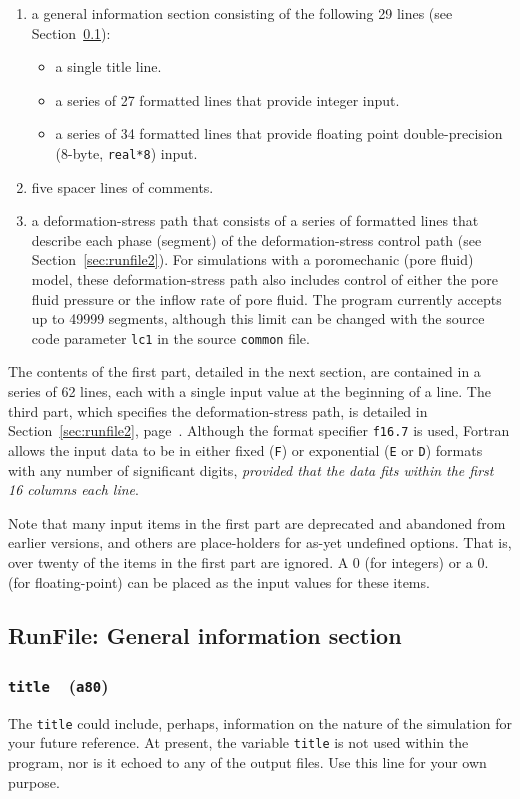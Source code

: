 \documentclass[letterpaper,11pt]{article}
\newcommand{\Var}[2]{\texttt{#1}\ \  (\texttt{#2})}
\begin{document}
\begin{enumerate}
\item
a general information section consisting of the following 29 lines
(see Section~\ref{sec:runfile1}):
\begin{itemize}
\item
a single title line.
\item
a series of 27 formatted lines that provide integer input.
\item
a series of 34 formatted lines that provide floating point
double-precision (8-byte, \texttt{real*8}) input.
\end{itemize}
\item
five spacer lines of comments.
\item
a deformation-stress path that consists of
a series of formatted lines that 
describe each phase (segment) of the deformation-stress control path
(see Section~\ref{sec:runfile2}).
For simulations with a poromechanic (pore fluid) model,
these deformation-stress path also includes
control of either the pore fluid pressure or the inflow rate
of pore fluid.
The program currently accepts up to 49999 segments,
although this limit can be changed with the source code
parameter \texttt{lc1} in the source \texttt{common} file.
\end{enumerate}
%
The contents of the first part, detailed in the next section,
are contained in a series of 62 lines, each with a single input value 
at the beginning of a line.
The third part, which specifies the deformation-stress path, 
is detailed in Section~\ref{sec:runfile2},
page~\pageref{sec:runfile2}.
Although the format specifier \texttt{f16.7} is used, Fortran allows
the input data to be in either fixed (\texttt{F}) or
exponential (\texttt{E} or \texttt{D}) formats with any number
of significant digits, \emph{provided that the data fits within the 
first 16 columns each line}.
%
\par
Note that many input items in the first part are
deprecated and abandoned from earlier versions,
and others are place-holders for as-yet undefined
options.
That is, over twenty of the items in the first part
are ignored.
A 0 (for integers) or a 0. (for floating-point) can be
placed as the input values for these items.
%
\subsection{\textsf{RunFile}: General information section}%
\label{sec:runfile1}
\subsubsection[\texttt{title}]{\Var{title}{a80}}
The \texttt{title} could include, perhaps, information on the nature of
the simulation for your future reference.
At present, the variable \texttt{title} is not used within the
program, nor is it echoed to any of the output files.
Use this line for your own purpose.
%
\end{document}
